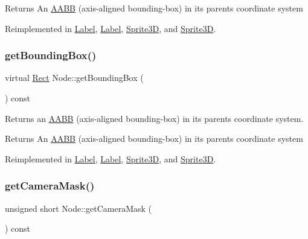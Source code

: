 \begin{DoxyReturn}{Returns}
An \hyperlink{classAABB}{A\+A\+BB} (axis-\/aligned bounding-\/box) in its parent\textquotesingle{}s coordinate system 
\end{DoxyReturn}


Reimplemented in \hyperlink{classLabel_a0b586d58df89f97fca24231c794335ca}{Label}, \hyperlink{classLabel_a05bcec134c3319eb75dc3fdebc1ab62e}{Label}, \hyperlink{classSprite3D_a90cebd7aa44add4a6726710b5642daf4}{Sprite3D}, and \hyperlink{classSprite3D_a45348972b8ce7b37c061b9888b00613a}{Sprite3D}.

\mbox{\label{classNode_a18d421a217968b87898b7a7382ff7e1b}} 
\subsubsection{\texorpdfstring{get\+Bounding\+Box()}{getBoundingBox()}\hspace{0.1cm}{\footnotesize\ttfamily [2/2]}}
{\footnotesize\ttfamily virtual \hyperlink{classRect}{Rect} Node\+::get\+Bounding\+Box (\begin{DoxyParamCaption}{ }\end{DoxyParamCaption}) const\hspace{0.3cm}{\ttfamily [virtual]}}

Returns an \hyperlink{classAABB}{A\+A\+BB} (axis-\/aligned bounding-\/box) in its parent\textquotesingle{}s coordinate system.

\begin{DoxyReturn}{Returns}
An \hyperlink{classAABB}{A\+A\+BB} (axis-\/aligned bounding-\/box) in its parent\textquotesingle{}s coordinate system 
\end{DoxyReturn}


Reimplemented in \hyperlink{classLabel_a0b586d58df89f97fca24231c794335ca}{Label}, \hyperlink{classLabel_a05bcec134c3319eb75dc3fdebc1ab62e}{Label}, \hyperlink{classSprite3D_a90cebd7aa44add4a6726710b5642daf4}{Sprite3D}, and \hyperlink{classSprite3D_a45348972b8ce7b37c061b9888b00613a}{Sprite3D}.

\mbox{\label{classNode_a1c849d2d0bd878a4e3dd1a52ab90fee8}} 
\subsubsection{\texorpdfstring{get\+Camera\+Mask()}{getCameraMask()}\hspace{0.1cm}{\footnotesize\ttfamily [1/2]}}
{\footnotesize\ttfamily unsigned short Node\+::get\+Camera\+Mask (\begin{DoxyParamCaption}{ }\end{DoxyParamCaption}) const\hspace{0.3cm}{\ttfamily [inline]}}

